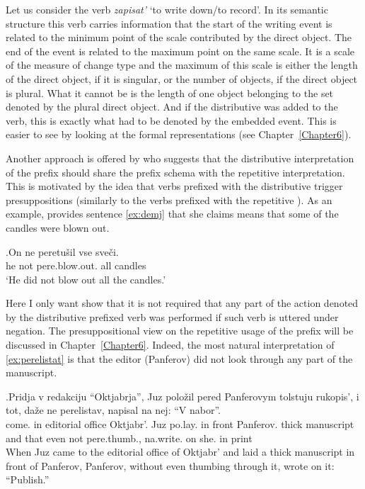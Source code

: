 Let us consider the verb \textit{zapisat'} `to write down/to record'. In its semantic structure this verb carries information that the start of the writing event is related to the minimum point of the scale contributed by the direct object. The end of the event is related to the maximum point on the same scale. It is a scale of the measure of change type and the maximum of this scale is either the length of the direct object, if it is singular, or the number of objects, if the direct object is plural. What it cannot be is the length of one object belonging to the set denoted by the plural direct object. And if the distributive  was added to the verb, this is exactly what had to be denoted by the embedded event. This is easier to see by looking at the formal representations (see Chapter~\ref{Chapter6}).

Another approach is offered by \citet{Demjjanow:97} who suggests that the distributive interpretation of the prefix  should share the prefix schema with the repetitive interpretation. This is motivated by the idea that verbs prefixed with the distributive  trigger presuppositions (similarly to the verbs prefixed with the repetitive ). As an example, \citet{Demjjanow:97} provides sentence \ref{ex:demj} that she claims means that some of the candles were blown out.

\exg.\label{ex:demj}On ne peretu\v{s}il vse sve\v{c}i.\\
he not pere.blow.out. all candles\\
\trans `He did not blow out all the candles.'\\

Here I only want show that it is not required that any part of the action denoted by the distributive prefixed verb was performed if such verb is uttered under negation. The presuppositional view on the repetitive usage of the prefix  will be discussed in Chapter~\ref{Chapter6}. Indeed, the most natural interpretation of \ref{ex:perelistat} is that the editor (Panferov) did not look through any part of the manuscript.

\exg.\label{ex:perelistat}Pridja v redakciju ``Oktjabrja'', Juz polo\v{z}il pered Panferovym tolstuju rukopis', i tot, da\v{z}e ne perelistav, napisal na nej: ``V nabor''.\\
come. in {editorial office} Oktjabr'. Juz po.lay. {in front} Panferov. thick manuscript and that even not pere.thumb., na.write. on she. in 	print\\
\vspace{0.5em}
When Juz came to the editorial office of Oktjabr' and laid a thick manuscript in front of Panferov, Panferov, without even thumbing through it, wrote on it: ``Publish.''



